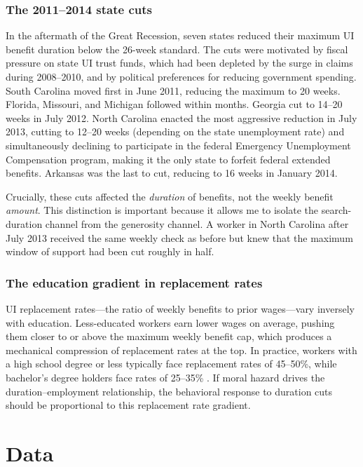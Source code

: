 \documentclass[12pt]{article}
\begin{document}
\subsubsection*{The 2011--2014 state cuts} In the aftermath of the Great Recession, seven states reduced their maximum UI benefit duration below the 26-week standard. The cuts were motivated by fiscal pressure on state UI trust funds, which had been depleted by the surge in claims during 2008--2010, and by political preferences for reducing government spending. South Carolina moved first in June 2011, reducing the maximum to 20 weeks. Florida, Missouri, and Michigan followed within months. Georgia cut to 14--20 weeks in July 2012. North Carolina enacted the most aggressive reduction in July 2013, cutting to 12--20 weeks (depending on the state unemployment rate) and simultaneously declining to participate in the federal Emergency Unemployment Compensation program, making it the only state to forfeit federal extended benefits. Arkansas was the last to cut, reducing to 16 weeks in January 2014.

Crucially, these cuts affected the \textit{duration} of benefits, not the weekly benefit \textit{amount}. This distinction is important because it allows me to isolate the search-duration channel from the generosity channel. A worker in North Carolina after July 2013 received the same weekly check as before but knew that the maximum window of support had been cut roughly in half.

\subsubsection*{The education gradient in replacement rates} UI replacement rates---the ratio of weekly benefits to prior wages---vary inversely with education. Less-educated workers earn lower wages on average, pushing them closer to or above the maximum weekly benefit cap, which produces a mechanical compression of replacement rates at the top. In practice, workers with a high school degree or less typically face replacement rates of 45--50\%, while bachelor's degree holders face rates of 25--35\% \citep{krueger2002labor, chetty2008moral}. If moral hazard drives the duration--employment relationship, the behavioral response to duration cuts should be proportional to this replacement rate gradient.


\section{Data}
\end{document}
